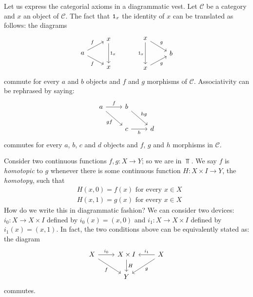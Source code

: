 \begin{example}
  Let us express the categorial axioms in a diagrammatic vest. Let
  \(\mathcal{C}\) be a category and \(x\) an object of \(\mathcal{C}\). The fact
  that \(\mathtt 1_x\) the identity of \(x\) can be translated as follows:
  the diagrams
  \begin{equation}\begin{tikzcd}[row sep=small]
      & x \ar["{\id_x}", dd] \\
      a \ar["f", ur] \ar["f", dr, swap]  \\
      & x &
    \end{tikzcd} \quad
    \begin{tikzcd}[row sep=small]
      x \ar["{\id_x}", dd, swap] \ar["g", dr] & \\
      &  b \\
      x \ar["g", ur, swap] &
    \end{tikzcd}
    \label{diag:IdPropDiag}\end{equation}
  commute for every \(a\) and \(b\) objects and \(f\) and \(g\)
  morphisms of \(\mathcal{C}\). Associativity can be rephrased by saying:
  \[
    \begin{tikzcd}
      a \ar["f", r] \ar["{gf}", swap, dr] & b \ar["{hg}", dr] \\
      & c \ar["h", swap, r] & d
    \end{tikzcd}
  \]
  commutes for every \(a\), \(b\), \(c\) and \(d\) objects and \(f\),
  \(g\) and \(h\) morphisms in \(\mathcal{C}\).
\end{example}

\begin{example}[Homotopy]
  Consider two continuous functions \(f, g : X \to Y\); so we are in
  \(\Top\). We say \(f\) is {\em homotopic} to \(g\) whenever there is
  some continuous function \(H : X \times I \to Y\), the {\em
    homotopy}, such that
  \begin{align*}
    & H(x, 0) = f(x) \text{ for every } x \in X \\
    & H(x, 1) = g(x) \text{ for every } x \in X
  \end{align*}
  How do we write this in diagrammatic fashion? We can consider two
  devices: \(i_0 : X \to X \times I\) defined by \(i_0(x) = (x, 0)\)
  and \(i_1 : X \to X \times I\) defined by \(i_1(x) = (x, 1)\). In
  fact, the two conditions above can be equivalently stated as: the
  diagram
  \[
    \begin{tikzcd}
      X \ar["{i_0}", r] \ar["f", dr, swap] & X \times I \ar["H", d] &
      X \ar["{i_1}", l,
      swap] \ar["g", dl] \\
      & Y
    \end{tikzcd}
  \]
  commutes.
\end{example}


